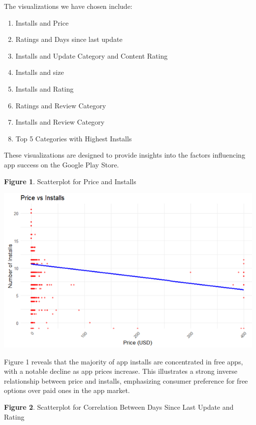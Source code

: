 \documentclass[
]{article}
\providecommand{\tightlist}{%
  \setlength{\itemsep}{0pt}\setlength{\parskip}{0pt}}
\begin{document}
The visualizations we have chosen include:

\begin{enumerate}
\def\labelenumi{\arabic{enumi}.}
\tightlist
\item
  Installs and Price
\item
  Ratings and Days since last update
\item
  Installs and Update Category and Content Rating
\item
  Installs and size
\item
  Installs and Rating
\item
  Ratings and Review Category
\item
  Installs and Review Category
\item
  Top 5 Categories with Highest Installs
\end{enumerate}

These visualizations are designed to provide insights into the factors
influencing app success on the Google Play Store.

\textbf{Figure 1}. Scatterplot for Price and Installs

\includegraphics{installs_vs_price.png}

Figure 1 reveals that the majority of app installs are concentrated in
free apps, with a notable decline as app prices increase. This
illustrates a strong inverse relationship between price and installs,
emphasizing consumer preference for free options over paid ones in the
app market.

\textbf{Figure 2}. Scatterplot for Correlation Between Days Since Last
Update and Rating
\end{document}
